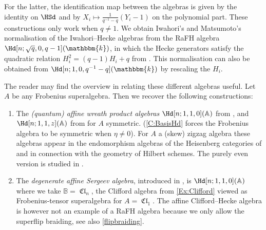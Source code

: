 \documentclass[a4paper,11pt]{amsart}
\numberwithin{equation}{subsection}
\theoremstyle{definition}
\theoremstyle{theorem}
\theoremstyle{remark}
\DeclareMathOperator\Cl{\mathfrak{Cl}}
\newcommand\kk{\mathbbm{k}}
\newcommand{\Ao}{\mathbb{A}}
\newcommand{\Bo}{\mathbb{B}}
\begin{document}
\begin{Examples}
\begin{enumerate}[series=HHexamples, label=(\alph*), ref=\autoref{HHdexamples}.(\alph*)]
     For the latter, the identification
     map between the algebras is given by the identity on $\HSd$ and by $X_i\mapsto \frac1{q^{-1}-q}(Y_i-1)$ on the polynomial part. These
     constructions only work when $q\ne1$. We obtain
     Iwahori's and
     Matsumoto's~\cite{IwahoriMatsumoto} normalisation of the
     Iwahori--Hecke algebras from the RaFH algebra
     $\Hd[n;\sqrt{q},0,q-1](\kk)$, in which the Hecke generators satisfy
     the quadratic relation $H_i^2=(q-1)H_i+q$ from
     \cite{IwahoriMatsumoto}. This normalisation can also be obtained
     from $\Hd[n;1,0,q^{-1}-q](\kk)$ by rescaling the $H_i$.
 \end{enumerate}
 The reader may find the overview in  \cite[I.2.2]{Meinel} relating
 these different algebras useful. Let $A$ be any Frobenius superalgebra.
 Then we recover the following constructions:
 \begin{enumerate}[resume*=HHexamples]
   \item\label{ex:quantumwreath} The \emph{(quantum) affine wreath product algebras}
   $\Hd[n;1,1,0](\Ao)$ from \cite{Savage:AffineWreath}, and
   $\Hd[n;1,1,z](\Ao)$  from \cite{RossoSavage:QuantumAffineWreath} for
   $A$ symmetric. (\autoref{C:BasisHd} forces the
   Frobenius algebra to be symmetric when $\eta\not=0$). For $A$ a (skew) zigzag algebra these algebras appear in the endomorphism algebras of the
Heisenberg categories of \cite[\S10.3]{CautisLicata:Heisenberg} and in connection with the geometry of Hilbert schemes. The purely even version is studied in \cite{KleshchevMuth}.

   \item\label{ex:Sergeev} The \emph{degenerate affine Sergeev algebra}, introduced in \cite{Sergeev, Nazarov}, is
     $\Hd[n;1,1,0](\Ao)$ where we take   $\Bo=\Cl_n$, the Clifford algebra from
     \autoref{Ex:Clifford} viewed as Frobenius-tensor superalgebra for
     $A=\Cl_1$. The affine Clifford--Hecke algebra is however not an example of a RaFH
     algebra because we only allow the superflip braiding, see also \autoref{flipbraiding}.


\end{enumerate}
\end{Examples}
\end{document}

